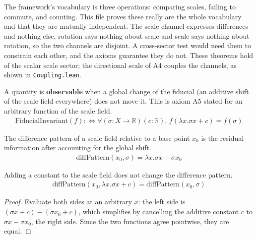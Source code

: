 The framework's vocabulary is three operations: comparing scales, failing to commute, and counting.  This file proves these really are the whole vocabulary and that they are mutually independent.  The scale channel expresses differences and nothing else, rotation says nothing about scale and scale says nothing about rotation, so the two channels are disjoint.  A cross-sector test would need them to constrain each other, and the axioms guarantee they do not.  These theorems hold of the scalar scale sector; the directional scale of A4 couples the channels, as shown in \texttt{Coupling.lean}.

\begin{definition}
A quantity is \textbf{observable} when a global change of the fiducial (an additive shift of the scale field everywhere) does not move it.  This is axiom A5 stated for an arbitrary function of the scale field.
\begin{align*}
\text{FiducialInvariant}(f) :\Leftrightarrow \forall (\sigma : X \to \mathbb{R})(c : \mathbb{R}), \, f(\lambda x. \sigma x + c) = f(\sigma)
\end{align*}
\end{definition}

\begin{definition}
The difference pattern of a scale field relative to a base point $x_0$ is the residual information after accounting for the global shift.
\begin{align*}
\text{diffPattern}(x_0, \sigma) = \lambda x. \sigma x - \sigma x_0
\end{align*}
\end{definition}

\begin{proposition}
Adding a constant to the scale field does not change the difference pattern.
\begin{align*}
\text{diffPattern}(x_0, \lambda x. \sigma x + c) = \text{diffPattern}(x_0, \sigma)
\end{align*}
\begin{proof}
Evaluate both sides at an arbitrary $x$: the left side is $(\sigma x + c) - (\sigma x_0 + c)$, which simplifies by cancelling the additive constant $c$ to $\sigma x - \sigma x_0$, the right side. Since the two functions agree pointwise, they are equal.
\end{proof}
\end{proposition}

